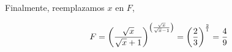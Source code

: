 {Finalmente, reemplazamos $x$ en $F$,
 }

\begin{LnxRptaBox}
	\[
	F= \pqty{\frac{\sqrt{x}}{\sqrt{x}+1}}^{\pqty{\frac{\sqrt{x}}{\sqrt{x}-1}}} = \pqty{\frac{2}{3}}^{\frac{2}{1}}= \frac{4}{9}
	\]
\end{LnxRptaBox}
